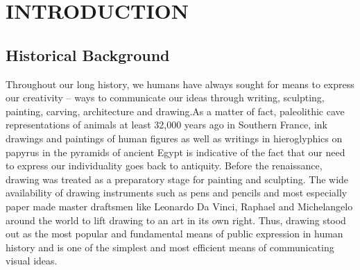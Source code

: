 \chapter{INTRODUCTION} %
\label{Introduction} %

\section{Historical Background}
\hspace{30}Throughout our long history, we humans have always sought for means 
to express our creativity – ways to communicate our ideas through writing, 
sculpting, painting, carving, architecture and drawing.As a matter of fact,
paleolithic cave representations of animals at least 32,000 years ago in  
Southern France, ink drawings and paintings of human figures as well as writings 
in hieroglyphics on papyrus in the pyramids of ancient Egypt is
indicative of the fact that our need to express our individuality goes back to
antiquity. Before the renaissance, drawing was treated as a preparatory stage
for painting and sculpting. The wide availability of drawing instruments such as 
pens and pencils and most especially paper made master draftsmen like
Leonardo Da Vinci, Raphael and Michelangelo around the world to lift drawing
to an art in its own right. Thus, drawing stood out as the most popular and
fundamental means of public expression in human history and is one of the
simplest and most efficient means of communicating visual ideas. \cite{1}\\

